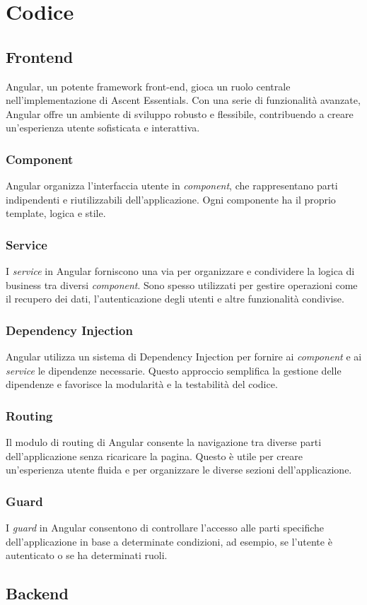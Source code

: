 
\chapter{Codice}

\section{Frontend}

Angular, un potente framework front-end, gioca un ruolo centrale nell'implementazione di Ascent Essentials. Con una serie di funzionalità avanzate, Angular offre un ambiente di sviluppo robusto e flessibile, contribuendo a creare un'esperienza utente sofisticata e interattiva.

\subsection{Component}

Angular organizza l'interfaccia utente in \textit{component}, che rappresentano parti indipendenti e riutilizzabili dell'applicazione. Ogni componente ha il proprio template, logica e stile.

\subsection{Service}

I \textit{service} in Angular forniscono una via per organizzare e condividere la logica di business tra diversi \textit{component}. Sono spesso utilizzati per gestire operazioni come il recupero dei dati, l'autenticazione degli utenti e altre funzionalità condivise.

\subsection{Dependency Injection}
Angular utilizza un sistema di Dependency Injection per fornire ai \textit{component} e ai \textit{service} le dipendenze necessarie. Questo approccio semplifica la gestione delle dipendenze e favorisce la modularità e la testabilità del codice.

\subsection{Routing}
Il modulo di routing di Angular consente la navigazione tra diverse parti dell'applicazione senza ricaricare la pagina. Questo è utile per creare un'esperienza utente fluida e per organizzare le diverse sezioni dell'applicazione.

\subsection{Guard}

I \textit{guard} in Angular consentono di controllare l'accesso alle parti specifiche dell'applicazione in base a determinate condizioni, ad esempio, se l'utente è autenticato o se ha determinati ruoli.

\section{Backend}